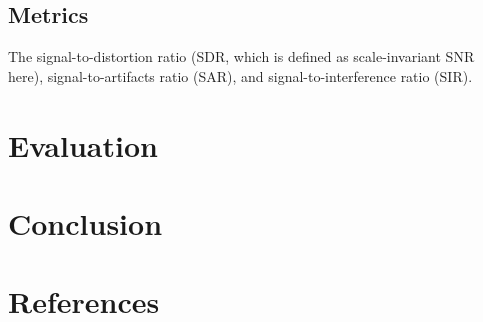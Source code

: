 \documentclass{article}
\begin{document}
\subsection{Metrics}
The signal-to-distortion ratio (SDR, which is defined as scale-invariant SNR here), signal-to-artifacts ratio (SAR), and signal-to-interference ratio (SIR).

\section{Evaluation}
\label{sec:majhead}



\section{Conclusion}
\label{sec:print}



\vfill\pagebreak

\section{References}
\label{sec:refs}





\end{document}
